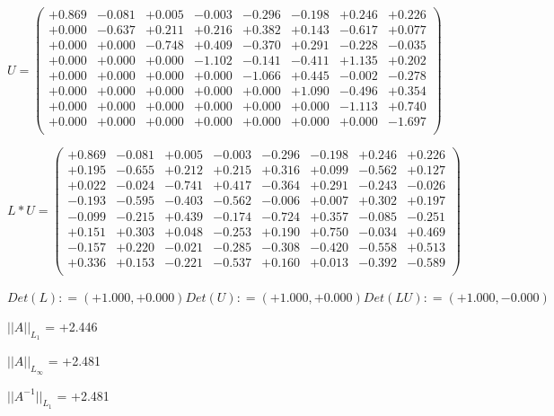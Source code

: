\documentclass[9pt]{article}
\theoremstyle{plain}
\theoremstyle{definition}
\theoremstyle{remark}
\numberwithin{equation}{section}
\begin{document}
$U = \left(
\begin{array}{
cccccccc}
+0.869 & -0.081 & +0.005 & -0.003 & -0.296 & -0.198 & +0.246 & +0.226 \\
+0.000 & -0.637 & +0.211 & +0.216 & +0.382 & +0.143 & -0.617 & +0.077 \\
+0.000 & +0.000 & -0.748 & +0.409 & -0.370 & +0.291 & -0.228 & -0.035 \\
+0.000 & +0.000 & +0.000 & -1.102 & -0.141 & -0.411 & +1.135 & +0.202 \\
+0.000 & +0.000 & +0.000 & +0.000 & -1.066 & +0.445 & -0.002 & -0.278 \\
+0.000 & +0.000 & +0.000 & +0.000 & +0.000 & +1.090 & -0.496 & +0.354 \\
+0.000 & +0.000 & +0.000 & +0.000 & +0.000 & +0.000 & -1.113 & +0.740 \\
+0.000 & +0.000 & +0.000 & +0.000 & +0.000 & +0.000 & +0.000 & -1.697 \\
\end{array}
\right)$ \newline 

$L * U  = \left(
\begin{array}{
cccccccc}
+0.869 & -0.081 & +0.005 & -0.003 & -0.296 & -0.198 & +0.246 & +0.226 \\
+0.195 & -0.655 & +0.212 & +0.215 & +0.316 & +0.099 & -0.562 & +0.127 \\
+0.022 & -0.024 & -0.741 & +0.417 & -0.364 & +0.291 & -0.243 & -0.026 \\
-0.193 & -0.595 & -0.403 & -0.562 & -0.006 & +0.007 & +0.302 & +0.197 \\
-0.099 & -0.215 & +0.439 & -0.174 & -0.724 & +0.357 & -0.085 & -0.251 \\
+0.151 & +0.303 & +0.048 & -0.253 & +0.190 & +0.750 & -0.034 & +0.469 \\
-0.157 & +0.220 & -0.021 & -0.285 & -0.308 & -0.420 & -0.558 & +0.513 \\
+0.336 & +0.153 & -0.221 & -0.537 & +0.160 & +0.013 & -0.392 & -0.589 \\
\end{array}
\right)$ \newline 

$Det(L) :    = (+1.000,+0.000)     Det(U) :    = (+1.000,+0.000)     Det(LU) :    = (+1.000,-0.000)$

$||A||_{L_1}$  = +2.446

$||A||_{L_{\infty}}$ = +2.481

$||A^{-1}||_{L_1}$  = +2.481
\end{document}
